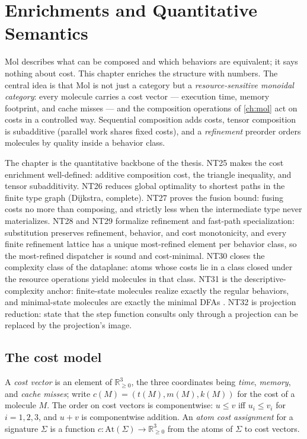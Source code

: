 \chapter{Enrichments and Quantitative Semantics}\label{ch:enrich}

Mol describes what can be composed and which behaviors are equivalent; it says
nothing about cost. This chapter enriches the structure with numbers. The
central idea is that Mol is not just a category but a \emph{resource-sensitive
monoidal category}: every molecule carries a cost vector --- execution time,
memory footprint, and cache misses --- and the composition operations of
\autoref{ch:mol} act on costs in a controlled way. Sequential composition
adds costs, tensor composition is subadditive (parallel work shares fixed
costs), and a \emph{refinement} preorder orders molecules by quality inside a
behavior class.

The chapter is the quantitative backbone of the thesis. NT25 makes the cost
enrichment well-defined: additive composition cost, the triangle inequality,
and tensor subadditivity. NT26 reduces global optimality to shortest paths in
the finite type graph (Dijkstra, complete). NT27 proves the fusion bound:
fusing costs no more than composing, and strictly less when the intermediate
type never materializes. NT28 and NT29 formalize refinement and fast-path
specialization: substitution preserves refinement, behavior, and cost
monotonicity, and every finite refinement lattice has a unique most-refined
element per behavior class, so the most-refined dispatcher is sound and
cost-minimal. NT30 closes the complexity class of the dataplane: atoms whose
costs lie in a class closed under the resource operations yield molecules in
that class. NT31 is the descriptive-complexity anchor: finite-state molecules
realize exactly the regular behaviors, and minimal-state molecules are exactly
the minimal DFAs \cite{nerode}\cite{hopcroft}. NT32 is projection reduction:
state that the step function consults only through a projection can be
replaced by the projection's image.

\section{The cost model}\label{sec:enrich-cost}

\begin{definition}\label{def:cost}
A \emph{cost vector} is an element of $\mathbb{R}_{\ge 0}^{3}$, the three
coordinates being \emph{time}, \emph{memory}, and \emph{cache misses}; write
$c(M) = (t(M), m(M), k(M))$ for the cost of a molecule $M$. The order on cost
vectors is componentwise: $u \le v$ iff $u_i \le v_i$ for $i = 1, 2, 3$, and
$u + v$ is componentwise addition. An \emph{atom cost assignment} for a
signature $\Sigma$ is a function $c \colon \mathrm{At}(\Sigma) \to
\mathbb{R}_{\ge 0}^{3}$ from the atoms of $\Sigma$ to cost vectors.
\end{definition}

